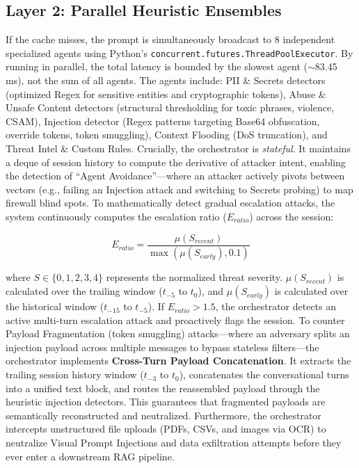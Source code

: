 \documentclass[conference]{IEEEtran}
\begin{document}
\subsection{Layer 2: Parallel Heuristic Ensembles}
If the cache misses, the prompt is simultaneously broadcast to 8 independent specialized agents using Python's \texttt{concurrent.futures.ThreadPoolExecutor}. By running in parallel, the total latency is bounded by the slowest agent ($\sim$83.45\,ms), not the sum of all agents. The agents include: PII \& Secrets detectors (optimized Regex for sensitive entities and cryptographic tokens), Abuse \& Unsafe Content detectors (structural thresholding for toxic phrases, violence, CSAM), Injection detector (Regex patterns targeting Base64 obfuscation, override tokens, token smuggling), Context Flooding (DoS truncation), and Threat Intel \& Custom Rules. Crucially, the orchestrator is \textit{stateful}. It maintains a deque of session history to compute the derivative of attacker intent, enabling the detection of ``Agent Avoidance''---where an attacker actively pivots between vectors (e.g., failing an Injection attack and switching to Secrets probing) to map firewall blind spots. To mathematically detect gradual escalation attacks, the system continuously computes the escalation ratio ($E_{ratio}$) across the session:

\begin{equation}
E_{ratio} = \frac{\mu(S_{recent})}{\max(\mu(S_{early}), 0.1)}
\end{equation}

where $S \in \{0,1,2,3,4\}$ represents the normalized threat severity. $\mu(S_{recent})$ is calculated over the trailing window ($t_{-5}$ to $t_0$), and $\mu(S_{early})$ is calculated over the historical window ($t_{-15}$ to $t_{-5}$). If $E_{ratio} > 1.5$, the orchestrator detects an active multi-turn escalation attack and proactively flags the session. To counter Payload Fragmentation (token smuggling) attacks---where an adversary splits an injection payload across multiple messages to bypass stateless filters---the orchestrator implements \textbf{Cross-Turn Payload Concatenation}. It extracts the trailing session history window ($t_{-3}$ to $t_0$), concatenates the conversational turns into a unified text block, and routes the reassembled payload through the heuristic injection detectors. This guarantees that fragmented payloads are semantically reconstructed and neutralized. Furthermore, the orchestrator intercepts unstructured file uploads (PDFs, CSVs, and images via OCR) to neutralize Visual Prompt Injections and data exfiltration attempts before they ever enter a downstream RAG pipeline. 
\end{document}

